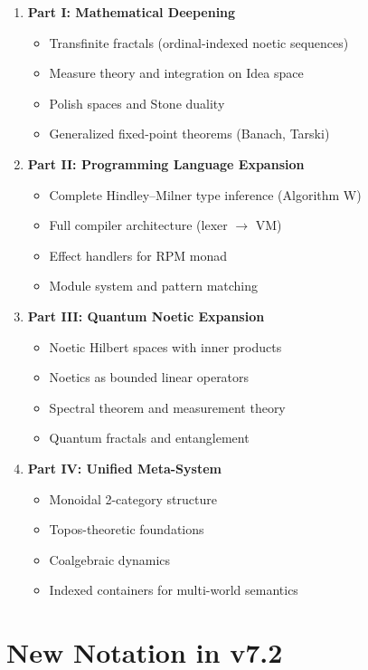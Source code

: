 \documentclass[11pt,twoside,openright]{book}
\theoremstyle{definition}
\theoremstyle{plain}
\theoremstyle{remark}
\begin{document}
\begin{enumerate}
  \item \textbf{Part I: Mathematical Deepening}
  \begin{itemize}
    \item Transfinite fractals (ordinal-indexed noetic sequences)
    \item Measure theory and integration on Idea space
    \item Polish spaces and Stone duality
    \item Generalized fixed-point theorems (Banach, Tarski)
  \end{itemize}

  \item \textbf{Part II: Programming Language Expansion}
  \begin{itemize}
    \item Complete Hindley--Milner type inference (Algorithm W)
    \item Full compiler architecture (lexer $\to$ VM)
    \item Effect handlers for RPM monad
    \item Module system and pattern matching
  \end{itemize}

  \item \textbf{Part III: Quantum Noetic Expansion}
  \begin{itemize}
    \item Noetic Hilbert spaces with inner products
    \item Noetics as bounded linear operators
    \item Spectral theorem and measurement theory
    \item Quantum fractals and entanglement
  \end{itemize}

  \item \textbf{Part IV: Unified Meta-System}
  \begin{itemize}
    \item Monoidal 2-category structure
    \item Topos-theoretic foundations
    \item Coalgebraic dynamics
    \item Indexed containers for multi-world semantics
  \end{itemize}
\end{enumerate}

\section*{New Notation in v7.2}
\end{document}
